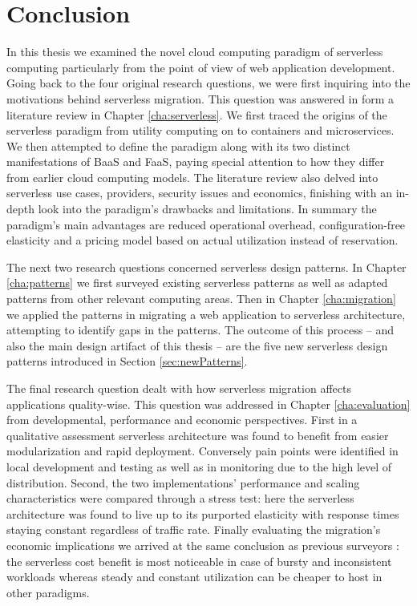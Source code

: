 \chapter{Conclusion}

In this thesis we examined the novel cloud computing paradigm of serverless computing particularly from the point of view of web application development. Going back to the four original research questions, we were first inquiring into the motivations behind serverless migration. This question was answered in form a literature review in Chapter \ref{cha:serverless}. We first traced the origins of the serverless paradigm from utility computing on to containers and microservices. We then attempted to define the paradigm along with its two distinct manifestations of BaaS and FaaS, paying special attention to how they differ from earlier cloud computing models. The literature review also delved into serverless use cases, providers, security issues and economics, finishing with an in-depth look into the paradigm's drawbacks and limitations. In summary the paradigm's main advantages are reduced operational overhead, configuration-free elasticity and a pricing model based on actual utilization instead of reservation.

The next two research questions concerned serverless design patterns. In Chapter \ref{cha:patterns} we first surveyed existing serverless patterns as well as adapted patterns from other relevant computing areas. Then in Chapter \ref{cha:migration} we applied the patterns in migrating a web application to serverless architecture, attempting to identify gaps in the patterns. The outcome of this process -- and also the main design artifact of this thesis -- are the five new serverless design patterns introduced in Section \ref{sec:newPatterns}.

The final research question dealt with how serverless migration affects applications quality-wise. This question was addressed in Chapter \ref{cha:evaluation} from developmental, performance and economic perspectives. First in a qualitative assessment serverless  architecture was found to benefit from easier modularization and rapid deployment. Conversely pain points were identified in local development and testing as well as in monitoring due to the high level of distribution. Second, the two implementations' performance and scaling characteristics were compared through a stress test: here the serverless architecture was found to live up to its purported elasticity with response times staying constant regardless of traffic rate. Finally evaluating the migration's economic implications we arrived at the same conclusion as previous surveyors \parencite[including][]{baldini17currentTrends}: the serverless cost benefit is most noticeable in case of bursty and inconsistent workloads whereas steady and constant utilization can be cheaper to host in other paradigms.

